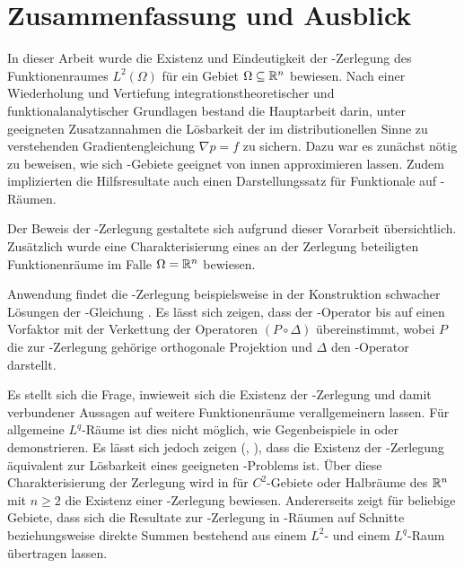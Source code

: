 \chapter{Zusammenfassung und Ausblick}

In dieser Arbeit wurde die Existenz und Eindeutigkeit der \helmholtz\hyp{}Zerlegung des Funktionenraumes $L^2(\Omega)$ für ein Gebiet $\Omega \subseteq \mathbb{R}^n$ bewiesen.
Nach einer Wiederholung und Vertiefung integrationstheoretischer und funktionalanalytischer Grundlagen bestand die Hauptarbeit darin, unter geeigneten Zusatzannahmen die Lösbarkeit der im distributionellen Sinne zu verstehenden Gradientengleichung $\nabla p = f$ zu sichern.
Dazu war es zunächst nötig zu beweisen, wie sich \lipschitz\hyp{}Gebiete geeignet von innen approximieren lassen.
Zudem implizierten die Hilfsresultate auch einen Darstellungssatz für Funktionale auf \sobolev\hyp{}Räumen.

Der Beweis der \helmholtz\hyp{}Zerlegung gestaltete sich aufgrund dieser Vorarbeit übersichtlich.
Zusätzlich wurde eine Charakterisierung eines an der Zerlegung beteiligten Funktionenräume im Falle $\Omega = \mathbb{R}^n$ bewiesen.

Anwendung findet die \helmholtz\hyp{}Zerlegung beispielsweise in der Konstruktion schwacher Lösungen der \stokes\hyp{}Gleichung \cite[S.129f.]{sohr2001navier}. 
Es lässt sich zeigen, dass der \stokes\hyp{}Operator bis auf einen Vorfaktor mit der Verkettung der Operatoren $(P \circ \Delta)$ übereinstimmt, wobei $P$ die zur \helmholtz\hyp{}Zerlegung gehörige orthogonale Projektion und $\Delta$ den \laplace\hyp{}Operator darstellt.

Es stellt sich die Frage, inwieweit sich die Existenz der \helmholtz\hyp{}Zerlegung und damit verbundener Aussagen auf weitere Funktionenräume verallgemeinern lassen.
Für allgemeine $L^q$\hyp{}Räume ist dies nicht möglich, wie Gegenbeispiele in \cite{maslennikova1986elliptic} oder \cite{bogovski1986decomposition} demonstrieren.
Es lässt sich jedoch zeigen (\cite{simader1992new}, \cite[S.146, Lemma III.1.2]{galdi2011navier}), dass die Existenz der \helmholtz\hyp{}Zerlegung äquivalent zur Lösbarkeit eines geeigneten \neumann\hyp{}Problems ist. 
Über diese Charakterisierung der Zerlegung wird in \cite[S.152, Theorem III.1.2]{galdi2011navier} für $C^2$-Gebiete oder Halbräume des $\mathbb{R}^n$ mit $n \geq 2$ die Existenz einer \helmholtz\hyp{}Zerlegung bewiesen.
Andererseits zeigt \cite{farwig05anLq} für beliebige Gebiete, dass sich die Resultate zur \helmholtz\hyp{}Zerlegung in \hilbert\hyp{}Räumen auf Schnitte beziehungsweise direkte Summen bestehend aus einem $L^2$- und einem $L^q$\hyp{}Raum übertragen lassen.

